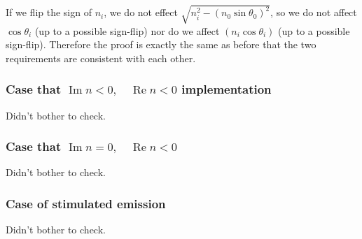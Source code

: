 \documentclass[12pt]{article}
\renewcommand{\(}{\left(}
\renewcommand{\)}{\right)}
\renewcommand{\Im}{\operatorname{Im}}
\renewcommand{\Re}{\operatorname{Re}}
\begin{document}
If we flip the sign of $n_i$, we do not effect $\sqrt{n_i^2 - (n_0 \sin \theta_0)^2}$, so we do not affect $\cos \theta_i$ (up to a possible sign-flip) nor do we affect $(n_i \cos \theta_i)$ (up to a possible sign-flip). Therefore the proof is exactly the same as before that the two requirements are consistent with each other.

\subsubsection{Case that $\Im n<0, \quad \Re n < 0$ implementation}

Didn't bother to check.

\subsubsection{Case that $\Im n=0, \quad \Re n < 0$}

Didn't bother to check.

\subsubsection{Case of stimulated emission}

Didn't bother to check.
\end{document}
